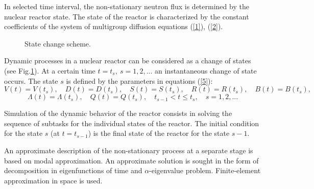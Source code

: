 \documentclass[authoryear]{elsarticle}
\begin{document}
In selected time interval, the non-stationary neutron flux is determined by the nuclear reactor state. The state of the reactor is characterized by the constant coefficients of the system of multigroup diffusion equations (\ref{1}), (\ref{2}).

\begin{figure}[ht] 
  \begin{center}
\vspace{5mm} 
    \caption{State change scheme.} 
   \label{fig:1}
  \end{center}
\end{figure}

Dynamic processes in a nuclear reactor can be considered as a change of states  (see  Fig.\ref{fig:1}). 
At a certain time $t = t_s, \ s = 1,2, ...$ an instantaneous change of state occurs. The state
 $s$ is defined by the parameters in equations  (\ref{5}):
\[
 V(t) = V(t_s), \quad  D(t) = D(t_s), \quad  S(t) = S(t_s), \quad  R(t) = R(t_s), \quad  B(t) = B(t_s),
\] 
\[
 \Lambda(t) = \Lambda(t_s), \quad  Q(t) = Q(t_s),
 \quad t_{s-1} < t \leq t_s, \quad s = 1,2, ... 
\] 


Simulation of the dynamic behavior of the reactor consists in solving the sequence of subtasks for the individual states of the reactor. The initial condition for the state $s$ (at $t = t_{s-1}$) is the final state of the reactor for the state $s-1$.

An approximate description of the non-stationary process at a separate stage is based on modal approximation. An approximate solution is sought in the form of decomposition in eigenfunctions of time and $\alpha$-eigenvalue problem. Finite-element approximation in space is used.
\end{document}
